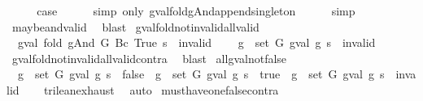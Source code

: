 \begin{isabellebody}
\ \ \isamarkupfalse%
\ \isamarkupfalse%
\ {\isacharquery}case\isanewline
\ \ \ \ \isamarkupfalse%
\ {\isacharparenleft}simp\ only{\isacharcolon}\ gval{\isacharunderscore}fold{\isacharunderscore}gAnd{\isacharunderscore}append{\isacharunderscore}singleton{\isacharparenright}\isanewline
\ \ \ \ \isamarkupfalse%
\ simp\isanewline
\ \ \ \ \isamarkupfalse%
\ maybe{\isacharunderscore}and{\isacharunderscore}valid\ \isamarkupfalse%
\ blast\isanewline
{}\isamarkupfalse%
%
\endisatagproof
{\isafoldproof}%
%
\isadelimproof
\isanewline
%
\endisadelimproof
\isanewline
{}\isamarkupfalse%
\ gval{\isacharunderscore}fold{\isacharunderscore}not{\isacharunderscore}invalid{\isacharunderscore}all{\isacharunderscore}valid{\isacharcolon}\isanewline
\ \ {\isachardoublequoteopen}gval\ {\isacharparenleft}fold\ gAnd\ G\ {\isacharparenleft}Bc\ True{\isacharparenright}{\isacharparenright}\ s\ {\isasymnoteq}\ invalid\ {\isasymLongrightarrow}\isanewline
\ \ \ {\isasymforall}g\ {\isasymin}\ set\ G{\isachardot}\ gval\ g\ s\ {\isasymnoteq}\ invalid{\isachardoublequoteclose}\isanewline
%
\isadelimproof
\ \ %
\endisadelimproof
%
\isatagproof
{}\isamarkupfalse%
\ gval{\isacharunderscore}fold{\isacharunderscore}not{\isacharunderscore}invalid{\isacharunderscore}all{\isacharunderscore}valid{\isacharunderscore}contra\ \isamarkupfalse%
\ blast%
\endisatagproof
{\isafoldproof}%
%
\isadelimproof
\isanewline
%
\endisadelimproof
\isanewline
{}\isamarkupfalse%
\ all{\isacharunderscore}gval{\isacharunderscore}not{\isacharunderscore}false{\isacharcolon}\isanewline
\ \ {\isachardoublequoteopen}{\isacharparenleft}{\isasymforall}g\ {\isasymin}\ set\ G{\isachardot}\ gval\ g\ s\ {\isasymnoteq}\ false{\isacharparenright}\ {\isacharequal}\ {\isacharparenleft}{\isasymforall}g\ {\isasymin}\ set\ G{\isachardot}\ gval\ g\ s\ {\isacharequal}\ true{\isacharparenright}\ {\isasymor}\ {\isacharparenleft}{\isasymexists}g\ {\isasymin}\ set\ G{\isachardot}\ gval\ g\ s\ {\isacharequal}\ invalid{\isacharparenright}{\isachardoublequoteclose}\isanewline
%
\isadelimproof
\ \ %
\endisadelimproof
%
\isatagproof
{}\isamarkupfalse%
\ trilean{\isachardot}exhaust\ \isamarkupfalse%
\ auto%
\endisatagproof
{\isafoldproof}%
%
\isadelimproof
\isanewline
%
\endisadelimproof
\isanewline
{}\isamarkupfalse%
\ must{\isacharunderscore}have{\isacharunderscore}one{\isacharunderscore}false{\isacharunderscore}contra{\isacharcolon}\isanewline

\end{isabellebody}
